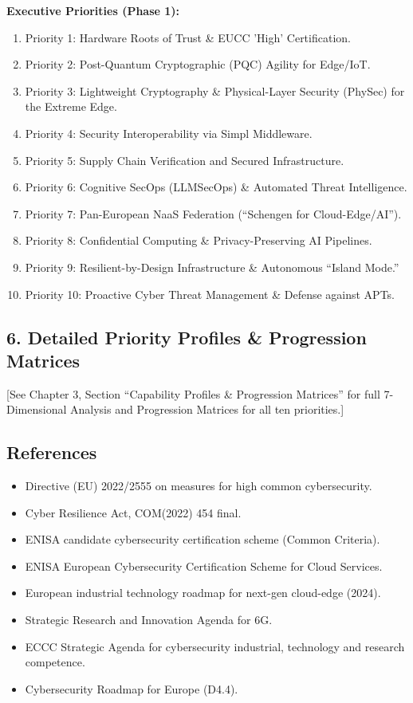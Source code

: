 \documentclass[12pt,a4paper]{report}
\begin{document}
\noindent\textbf{Executive Priorities (Phase 1):}
\begin{enumerate}
    \item Priority 1: Hardware Roots of Trust \& EUCC 'High' Certification.
    \item Priority 2: Post-Quantum Cryptographic (PQC) Agility for Edge/IoT.
    \item Priority 3: Lightweight Cryptography \& Physical-Layer Security (PhySec) for the Extreme Edge.
    \item Priority 4: Security Interoperability via Simpl Middleware.
    \item Priority 5: Supply Chain Verification and Secured Infrastructure.
    \item Priority 6: Cognitive SecOps (LLMSecOps) \& Automated Threat Intelligence.
    \item Priority 7: Pan-European NaaS Federation (``Schengen for Cloud-Edge/AI'').
    \item Priority 8: Confidential Computing \& Privacy-Preserving AI Pipelines.
    \item Priority 9: Resilient-by-Design Infrastructure \& Autonomous ``Island Mode.''
    \item Priority 10: Proactive Cyber Threat Management \& Defense against APTs.
\end{enumerate}

\subsection{6. Detailed Priority Profiles \& Progression Matrices}
[See Chapter 3, Section ``Capability Profiles \& Progression Matrices'' for full 7-Dimensional Analysis and Progression Matrices for all ten priorities.]

\subsection{References}
\begin{itemize}[leftmargin=1.5cm, labelsep=0.2cm]
    \item[{[NIS2]}] Directive (EU) 2022/2555 on measures for high common cybersecurity.
    \item[{[CRA]}] Cyber Resilience Act, COM(2022) 454 final.
    \item[{[EUCC]}] ENISA candidate cybersecurity certification scheme (Common Criteria).
    \item[{[EUCS]}] ENISA European Cybersecurity Certification Scheme for Cloud Services.
    \item[{[Cloud-Edge]}] European industrial technology roadmap for next-gen cloud-edge (2024).
    \item[{[SNS JU]}] Strategic Research and Innovation Agenda for 6G.
    \item[{[ECCC]}] ECCC Strategic Agenda for cybersecurity industrial, technology and research competence.
    \item[{[CONCORDIA]}] Cybersecurity Roadmap for Europe (D4.4).
\end{itemize}
\end{document}
